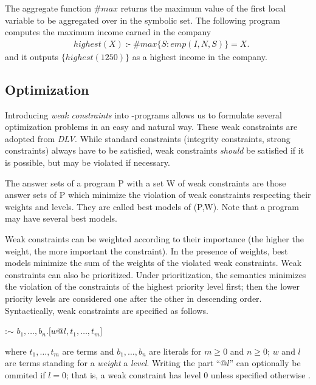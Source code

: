 \documentclass[a4paper, titlepage]{article}
\DeclareMathOperator{\leftimpl}{:-}
\newcommand\mycenterline[1]{\par\smallskip\centerline{#1} \smallskip}
\begin{document}
The aggregate function $\mathit{\#max}$ returns 
the maximum value of the first local variable to be 
aggregated over in the symbolic set. The following program 
computes the maximum income earned in the company
\begin{align*}
& \mathit{highest}(X) \leftimpl \mathit{\#max}\{S : 
\mathit{emp}(I,N,S)\} = X.
\end{align*}
and it outputs $\{highest(1250)\}$ as a highest income in 
the company.

\subsection{Optimization}
\label{optimize}
Introducing \emph{weak constraints} into \hex-programs 
allows us to formulate several optimization problems in an 
easy and natural way. These weak constraints are adopted 
from \emph{DLV}. While standard constraints (integrity 
constraints, strong constraints) always have to be 
satisfied, weak constraints \emph{should} be satisfied if it is 
possible, but may be violated if necessary.


The answer sets of a program P with a set W of weak 
constraints are those answer sets of P which minimize the 
violation of weak constraints respecting their weights and 
levels. They are called best models of (P,W). Note that a 
program may have several best models.


Weak constraints can be weighted according to their 
importance (the higher the weight, the more important the 
constraint). In the presence of weights, best models 
minimize the sum of the weights of the violated weak 
constraints. Weak constraints can also be prioritized. 
Under prioritization, the semantics minimizes the violation 
of the constraints of the highest priority level first; 
then the lower priority levels are considered one after the 
other in descending order. Syntactically, weak constraints 
are specified as follows.
%
\mycenterline{:$\sim$ $\mathit{b_1,\dots,b_n}. 
%
[\mathit{w}$@$\mathit{l},\mathit{t_1,\dots,t_m}]$} where $\mathit{t_1,\dots,t_m}$ 
are terms and $\mathit{b_1,\dots,b_n}$ are literals for $m \geq 0$  and $n \geq 0$; $w$ and $l$ are terms standing for a \emph{weight} a \emph{level}. Writing the part ``$\mathit{@l}$'' can optionally be ommited if $l=0$; that is, a weak constraint has level 0 unless specified otherwise \cite{cffiklrs2013}.
\end{document}

